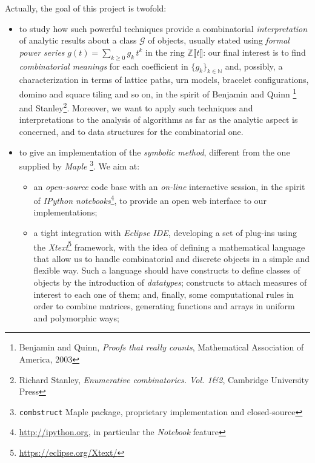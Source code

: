 Actually, the goal of this project is twofold: 
\begin{itemize}

    \item {} to study how
    such powerful techniques provide a combinatorial \emph{interpretation} of
    analytic results about a class $\mathcal{G}$ of objects, usually stated
    using \emph{formal power series} $g(t)=\sum_{k\geq0}{g_{k}\,t^{k}}$ in the
    ring $\mathbb{Z}\llbracket t \rrbracket$: our final interest is to find
    \emph{combinatorial meanings} for each coefficient in $\lbrace
    g_{k}\rbrace_{k\in\mathbb{N}}$ and, possibly, a characterization in terms
    of lattice paths, urn models, bracelet configurations, domino and square
    tiling and so on, in the spirit of Benjamin and Quinn \footnote{Benjamin
    and Quinn, \emph{Proofs that really counts}, Mathematical Association of
    America, 2003} and Stanley\footnote{Richard Stanley, \emph{Enumerative
    combinatorics. {V}ol. 1\&2}, Cambridge University Press}. Moreover, we want
    to apply such techniques and interpretations to the analysis of algorithms
    as far as the analytic aspect is concerned, and to data structures for the
    combinatorial one. %

    \item to give an implementation of the
        \emph{symbolic method}, different from the one supplied by \emph{Maple}
        \footnote{\texttt{combstruct} Maple package, proprietary implementation and
        closed-source}. We aim at: 
            
        \begin{itemize} 

            \item an \emph{open-source} code base with an \emph{on-line} interactive
            session, in the spirit of \emph{IPython
            notebooks}\footnote{\url{http://ipython.org}, in particular the
            \emph{Notebook} feature}, to provide an open web interface to our
            implementations; 

            \item a tight integration with \emph{Eclipse IDE}, developing a set of
            plug-ins using the \emph{Xtext}\footnote{\url{https://eclipse.org/Xtext/}}
            framework, with the idea of defining a mathematical language that allow us to
            handle combinatorial and discrete objects in a simple and flexible way. Such
            a language should have constructs to define classes of objects by the
            introduction of \emph{datatypes}; constructs to attach measures of interest
            to each one of them; and, finally, some computational rules in order to
            combine matrices, generating functions and arrays in uniform and
            polymorphic ways; 


\end{itemize}
\end{itemize}
